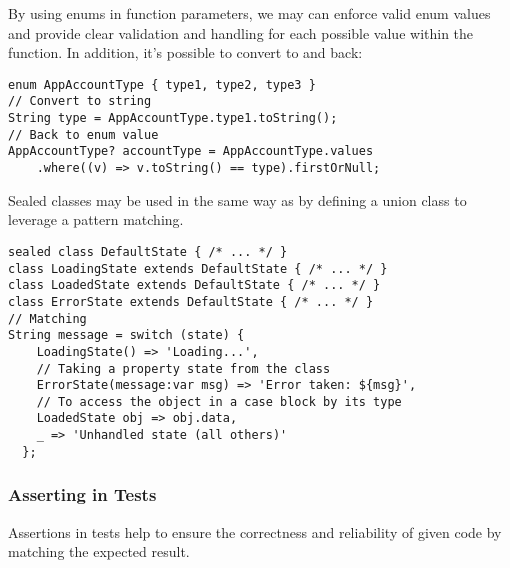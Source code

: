 \noindent By using enums in function parameters, we may can enforce valid enum values and provide clear validation and 
handling for each possible value within the function. In addition, it's possible to convert  to  and
back:

\begin{lstlisting}
enum AppAccountType { type1, type2, type3 }
// Convert to string
String type = AppAccountType.type1.toString();
// Back to enum value
AppAccountType? accountType = AppAccountType.values
    .where((v) => v.toString() == type).firstOrNull;
\end{lstlisting}

\noindent Sealed classes may be used in the same way as  by defining a union class to leverage a pattern matching.

\begin{lstlisting}
sealed class DefaultState { /* ... */ }
class LoadingState extends DefaultState { /* ... */ }
class LoadedState extends DefaultState { /* ... */ }
class ErrorState extends DefaultState { /* ... */ }
// Matching
String message = switch (state) {
    LoadingState() => 'Loading...',
    // Taking a property state from the class
    ErrorState(message:var msg) => 'Error taken: ${msg}',
    // To access the object in a case block by its type 
    LoadedState obj => obj.data,    
    _ => 'Unhandled state (all others)'
  };
\end{lstlisting}

\newpage
\subsubsection{Asserting in Tests}

Assertions in tests help to ensure the correctness and reliability of given code by matching the expected result.

